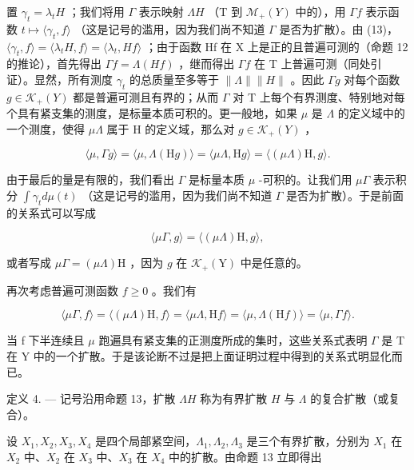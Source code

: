置 \(\gamma_{t} = \lambda_{t}H\) ；我们将用 \(\Gamma\) 表示映射 \(\Lambda H\) （T 到 \(\mathcal{M}_{+}(Y)\) 中的），用 \(\Gamma f\) 表示函数 \(t \mapsto \langle \gamma_{t}, f \rangle\) （这是记号的滥用，因为我们尚不知道 \(\Gamma\) 是否为扩散）。由 (13)，\(\langle \gamma_{t}, f \rangle = \langle \lambda_{t}H, f \rangle = \langle \lambda_{t}, Hf \rangle\) ；由于函数 Hf 在 X 上是正的且普遍可测的（命题 12 的推论），首先得出 \(\Gamma f = \Lambda(Hf)\) ，继而得出 \(\Gamma f\) 在 T 上普遍可测（同处引证）。显然，所有测度 \(\gamma_{t}\) 的总质量至多等于 \(\|\Lambda\| \|H\|\) 。因此 \(\Gamma g\) 对每个函数 \(g \in \mathcal{K}_{+}(Y)\) 都是普遍可测且有界的；从而 \(\Gamma\) 对 T 上每个有界测度、特别地对每个具有紧支集的测度，是标量本质可积的。更一般地，如果 \(\mu\) 是 \(\Lambda\) 的定义域中的一个测度，使得 \(\mu\Lambda\) 属于 H 的定义域，那么对 \(g \in \mathcal{K}_{+}(Y)\) ，

\[
\langle \mu , \Gamma g \rangle = \langle \mu , \Lambda (\mathrm{H} g) \rangle = \langle \mu \Lambda , \mathrm{H} g \rangle = \langle (\mu \Lambda) \mathrm{H}, g \rangle .
\]

由于最后的量是有限的，我们看出 \(\Gamma\) 是标量本质 \(\mu\) -可积的。让我们用 \(\mu\Gamma\) 表示积分 \(\int\gamma_{t}d\mu(t)\) （这是记号的滥用，因为我们尚不知道 \(\Gamma\) 是否为扩散）。于是前面的关系式可以写成

\[
\langle \mu \Gamma , g \rangle = \langle (\mu \Lambda) \mathrm{H}, g \rangle ,
\]

或者写成 \(\mu \Gamma = (\mu \Lambda)\mathrm{H}\) ，因为 \(g\) 在 \(\mathcal{K}_+(\mathrm{Y})\) 中是任意的。

再次考虑普遍可测函数 \(f \geqslant 0\) 。我们有

\[
\langle \mu \Gamma , f \rangle = \langle (\mu \Lambda) \mathrm{H}, f \rangle = \langle \mu \Lambda , \mathrm{H} f \rangle = \langle \mu , \Lambda (\mathrm{H} f) \rangle = \langle \mu , \Gamma f \rangle .
\]

当 f 下半连续且 \(\mu\) 跑遍具有紧支集的正测度所成的集时，这些关系式表明 \(\Gamma\) 是 T 在 Y 中的一个扩散。于是该论断不过是把上面证明过程中得到的关系式明显化而已。

定义 4. --- 记号沿用命题 13，扩散 \(\Lambda H\) 称为有界扩散 \(H\) 与 \(\Lambda\) 的复合扩散（或复合）。

设 \(X_{1}, X_{2}, X_{3}, X_{4}\) 是四个局部紧空间，\(\Lambda_{1}, \Lambda_{2}, \Lambda_{3}\) 是三个有界扩散，分别为 \(X_{1}\) 在 \(X_{2}\) 中、\(X_{2}\) 在 \(X_{3}\) 中、\(X_{3}\) 在 \(X_{4}\) 中的扩散。由命题 13 立即得出

